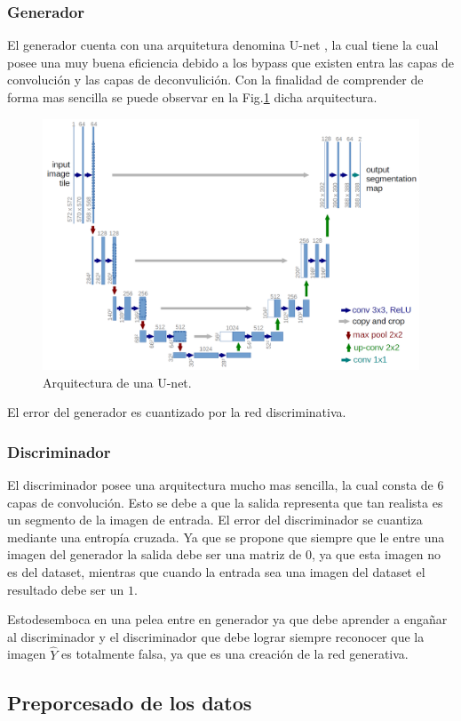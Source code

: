 \documentclass[]{IEEEtran}
\begin{document}
    \subsubsection{Generador}

    El generador cuenta con una arquitetura denomina U-net \cite{U-Net}, la cual tiene 
    la cual posee una muy buena eficiencia debido a los bypass que existen entra las capas de convolución y 
    las capas de deconvulición. Con la finalidad de comprender de forma mas sencilla se puede observar 
    en la Fig.\ref{fig:u-net} dicha arquitectura.

    \begin{figure}
        \centering
        \includegraphics[width=.4\textwidth]{Imgs/u-net-architecture.png}
        \caption{Arquitectura de una U-net.}
        \label{fig:u-net}
    \end{figure}

    El error del generador es cuantizado por la red discriminativa.

    \subsubsection{Discriminador}

    El discriminador posee una arquitectura mucho mas sencilla, la cual consta de $6$ capas de convolución.
    Esto se debe a que la salida representa que tan realista es un segmento de la imagen de entrada. 
    El error del discriminador se cuantiza mediante una entropía cruzada. Ya que 
    se propone que siempre que le entre una imagen del generador la salida debe ser una matriz de $0$, ya que 
    esta imagen no es del dataset, mientras que cuando la entrada sea una imagen del dataset el resultado debe ser un $1$. 
    
    Estodesemboca en una pelea entre en generador ya que debe aprender a engañar al discriminador 
    y el discriminador que debe lograr siempre reconocer que la imagen $\hat{Y}$ es totalmente falsa, ya que es una 
    creación de la red generativa.
 
    \subsection{Preporcesado de los datos}
\end{document}
